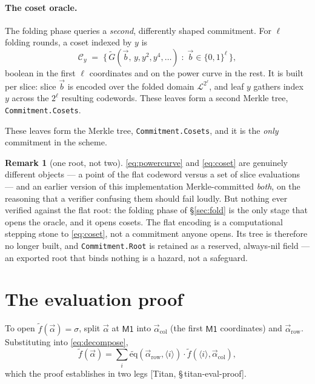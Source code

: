 \documentclass[11pt,a4paper]{article}
\newcommand{\dom}{\mathcal{L}}
\newcommand{\bin}[1]{\langle #1 \rangle}
\newcommand{\eq}{\widetilde{\mathrm{eq}}}
\newcommand{\paper}[1]{\textsf{[Titan, #1]}}
\theoremstyle{definition}
\newtheorem{remark}{Remark}
\begin{document}
\paragraph{The coset oracle.}
The folding phase queries a \emph{second}, differently shaped commitment. For
$\ell$ folding rounds, a coset indexed by $y$ is
\begin{equation}
  \mathcal{C}_y \;=\; \bigl\{\, \widetilde{G}(\vec b,\, y, y^2, y^4, \dots) \;:\; \vec b \in \{0,1\}^{\ell} \,\bigr\},
  \label{eq:coset}
\end{equation}
boolean in the first $\ell$ coordinates and on the power curve in the rest. It is built
per slice: slice $\vec b$ is encoded over the folded domain $\dom^{2^\ell}$, and leaf
$y$ gathers index $y$ across the $2^\ell$ resulting codewords. These leaves form a
second Merkle tree, \texttt{Commitment.Cosets}.

These leaves form the Merkle tree, \texttt{Commitment.Cosets}, and it is the
\emph{only} commitment in the scheme.

\begin{remark}[one root, not two]
\label{rem:oneroot}
\eqref{eq:powercurve} and \eqref{eq:coset} are genuinely different objects --- a point
of the flat codeword versus a set of slice evaluations --- and an earlier version of
this implementation Merkle-committed \emph{both}, on the reasoning that a verifier
confusing them should fail loudly. But nothing ever verified against the flat root:
the folding phase of \S\ref{sec:fold} is the only stage that opens the oracle, and it
opens cosets. The flat encoding is a computational stepping stone to \eqref{eq:coset},
not a commitment anyone opens. Its tree is therefore no longer built, and
\texttt{Commitment.Root} is retained as a reserved, always-nil field --- an exported
root that binds nothing is a hazard, not a safeguard.
\end{remark}

\section{The evaluation proof}
\label{sec:eval}

To open $\widetilde f(\vec\alpha) = \sigma$, split $\vec\alpha$ at $\mathsf{M1}$ into
$\vec\alpha_{\mathrm{col}}$ (the first $\mathsf{M1}$ coordinates) and
$\vec\alpha_{\mathrm{row}}$. Substituting into \eqref{eq:decompose},
\[
  \widetilde f(\vec\alpha)
  = \sum_i \eq(\vec\alpha_{\mathrm{row}}, \bin i) \cdot \widetilde f(\bin i, \vec\alpha_{\mathrm{col}}),
\]
which the proof establishes in two legs \paper{\S\,titan-eval-proof}.
\end{document}

